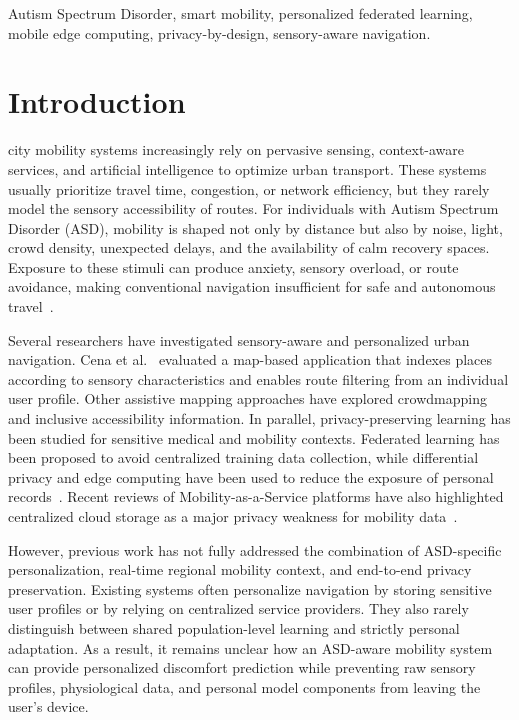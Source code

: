 \documentclass[lettersize,journal]{IEEEtran}
\begin{document}
\begin{IEEEkeywords}
Autism Spectrum Disorder, smart mobility, personalized federated
learning, mobile edge computing, privacy-by-design, sensory-aware
navigation.
\end{IEEEkeywords}

\section{Introduction}

 city mobility systems increasingly rely on pervasive sensing,
context-aware services, and artificial intelligence to optimize urban
transport. These systems usually prioritize travel time, congestion, or
network efficiency, but they rarely model the sensory accessibility of
routes. For individuals with Autism Spectrum Disorder (ASD), mobility
is shaped not only by distance but also by noise, light, crowd density,
unexpected delays, and the availability of calm recovery spaces.
Exposure to these stimuli can produce anxiety, sensory overload, or
route avoidance, making conventional navigation insufficient for safe
and autonomous travel~\cite{maclennan2023}.

Several researchers have investigated sensory-aware and personalized
urban navigation. Cena et al.~\cite{cena2023} evaluated a map-based
application that indexes places according to sensory characteristics and
enables route filtering from an individual user profile. Other
assistive mapping approaches have explored crowdmapping and inclusive
accessibility information. In parallel, privacy-preserving learning has
been studied for sensitive medical and mobility contexts. Federated
learning has been proposed to avoid centralized training data
collection, while differential privacy and edge computing have been
used to reduce the exposure of personal records~\cite{adnan2022,
alwarafy2020}. Recent reviews of Mobility-as-a-Service platforms have
also highlighted centralized cloud storage as a major privacy weakness
for mobility data~\cite{garroussi2025}.

However, previous work has not fully addressed the combination of
ASD-specific personalization, real-time regional mobility context, and
end-to-end privacy preservation. Existing systems often personalize
navigation by storing sensitive user profiles or by relying on
centralized service providers. They also rarely distinguish between
shared population-level learning and strictly personal adaptation. As a
result, it remains unclear how an ASD-aware mobility system can provide
personalized discomfort prediction while preventing raw sensory
profiles, physiological data, and personal model components from
leaving the user's device.
\end{document}

